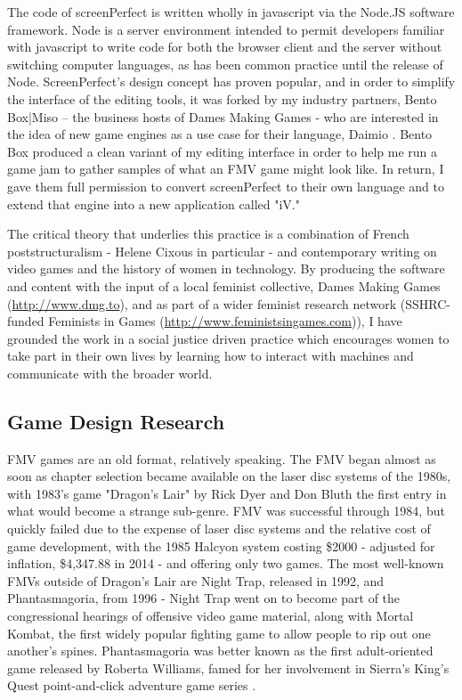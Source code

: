 The code of screenPerfect is written wholly in javascript via the Node.JS software framework. Node is a server environment intended to permit developers familiar with javascript to write code for both the browser client and the server without switching computer languages, as has been common practice until the release of Node. ScreenPerfect's design concept has proven popular, and in order to simplify the interface of the editing tools, it was forked by my industry partners, Bento Box|Miso – the business hosts of Dames Making Games - who are interested in the idea of new game engines as a use case for their language, Daimio \parencite{daimio}. Bento Box produced a clean variant of my editing interface in order to help me run a game jam to gather samples of what an FMV game might look like. In return, I gave them full permission to convert screenPerfect to their own language and to extend that engine into a new application called "iV." 

The critical theory that underlies this practice is a combination of French poststructuralism - Helene Cixous in particular - and contemporary writing on video games and the history of women in technology. By producing the software and content with the input of a local feminist collective, Dames Making Games (\url{http://www.dmg.to}), and as part of a wider feminist research network (SSHRC-funded Feminists in Games (\url{http://www.feministsingames.com})), I have grounded the work in a social justice driven practice which encourages women to take part in their own lives by learning how to interact with machines and communicate with the broader world.

\subsection{Game Design Research}
FMV games are an old format, relatively speaking. The FMV began almost as soon as chapter selection became available on the laser disc systems of the 1980s, with 1983's game "Dragon's Lair" by Rick Dyer and Don Bluth the first entry in what would become a strange sub-genre. FMV was successful through 1984, but quickly failed due to the expense of laser disc systems and the relative cost of game development, with the 1985 Halcyon system costing \$2000 - adjusted for inflation, \$4,347.88 in 2014 - and offering only two games. The most well-known FMVs outside of Dragon's Lair are Night Trap, released in 1992, and Phantasmagoria, from 1996 - Night Trap went on to become part of the congressional hearings of offensive video game material, along with Mortal Kombat, the first widely popular fighting game to allow people to rip out one another's spines. Phantasmagoria was better known as the first adult-oriented game released by Roberta Williams, famed for her involvement in Sierra's King's Quest point-and-click adventure game series \parencite{encyclopediavideogame}.

